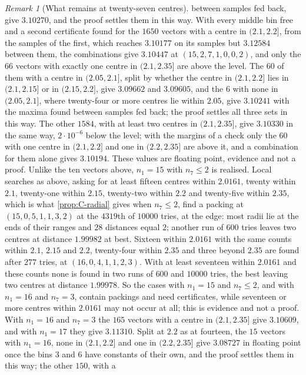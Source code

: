 \documentclass[11pt,reqno]{amsart}
\renewcommand{\_}{\origunderscore\allowbreak}
\numberwithin{equation}{section}
\theoremstyle{plain}
\theoremstyle{definition}
\theoremstyle{remark}
\newtheorem{remark}[thm]{Remark}
\begin{document}
\begin{remark}[What remains at twenty-seven centres]
between samples fed back, give $3.10270$, and the proof settles them in
this way. With every middle bin free and a
second certificate found for the $1650$ vectors with a centre in
$(2.1,2.2]$, from the samples of the first, which reaches $3.10177$ on its
samples but $3.12584$ between them, the combinations give $3.10447$ at
$(15,2,7,1,0,0,2)$, and only the $66$ vectors with exactly one centre in
$(2.1,2.35]$ are above the level. The $60$ of them with a centre in
$(2.05,2.1]$, split by whether the centre in $(2.1,2.2]$ lies in
$(2.1,2.15]$ or in $(2.15,2.2]$, give $3.09662$ and $3.09605$, and the
$6$ with none in $(2.05,2.1]$, where twenty-four or more centres lie within
$2.05$, give $3.10241$ with the maxima found between samples fed back; the
proof settles all three sets in this way. The other
$1584$, with at least two centres in $(2.1,2.35]$, give $3.10330$ in the
same way, $2\cdot10^{-6}$ below the level; with the margins of a check
only the $60$ with one centre in $(2.1,2.2]$ and one in $(2.2,2.35]$ are
above it, and a combination for them alone gives $3.10194$. These values
are floating point, evidence and not a proof.
Unlike the ten vectors above, $n_1=15$ with $n_7\le2$ is realised. Local
searches as above, asking for at least fifteen centres within $2.0161$,
twenty within $2.1$, twenty-one within $2.15$, twenty-two within $2.2$ and
twenty-five within $2.35$, which is what \cref{prop:C-radial} gives when
$n_7\le2$, find a packing at $(15,0,5,1,1,3,2)$ at the $4319$th of $10000$
tries, at the edge: most radii lie at the ends of their ranges and $28$
distances equal $2$; another run of $600$ tries leaves two centres at
distance $1.99982$ at best. Sixteen within $2.0161$ with the same counts within $2.1$,
$2.15$ and $2.2$, twenty-four within $2.35$ and three beyond $2.35$ are
found after $277$ tries, at $(16,0,4,1,1,2,3)$. With at least seventeen
within $2.0161$ and these counts none is found in two runs of $600$ and
$10000$ tries, the best leaving two centres at distance $1.99978$. So the cases with $n_1=15$ and
$n_7\le2$, and with $n_1=16$ and $n_7=3$, contain packings and need
certificates, while seventeen or more centres within $2.0161$ may not occur
at all; this is evidence and not a proof. With $n_1=16$ and $n_7=3$ the
$165$ vectors with a centre in $(2.1,2.35]$ give $3.10609$, and with
$n_1=17$ they give $3.11310$. Split at $2.2$ as at fourteen, the $15$
vectors with $n_1=16$, none in $(2.1,2.2]$ and one in $(2.2,2.35]$ give
$3.08727$ in floating point once the bins $3$ and $6$ have constants of
their own, and the proof settles them in this way; the other $150$, with a

\end{remark}
\end{document}
